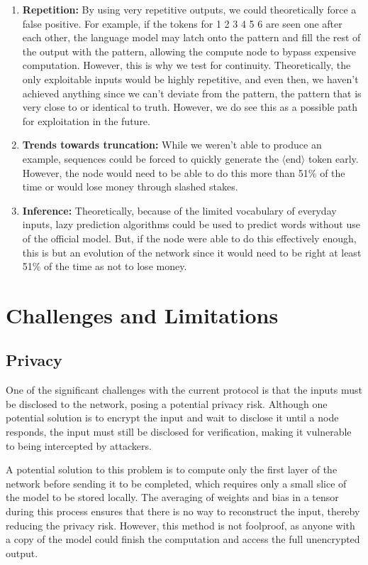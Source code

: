 \documentclass{article}
\begin{document}
\begin{enumerate}
    \item \textbf{Repetition:} By using very repetitive outputs, we could theoretically force a false positive. 
    For example, if the tokens for 1 2 3 4 5 6 are seen one after each other, the language model may latch onto the pattern and fill the rest of the output with the pattern, allowing the compute node to bypass expensive computation. 
    However, this is why we test for continuity. 
    Theoretically, the only exploitable inputs would be highly repetitive, and even then, we haven't achieved anything since we can't deviate from the pattern, the pattern that is very close to or identical to truth. 
    However, we do see this as a possible path for exploitation in the future.
    \item \textbf{Trends towards truncation:} While we weren't able to produce an example, sequences could be forced to quickly generate the $\langle$end$\rangle$ token early. 
    However, the node would need to be able to do this more than 51\% of the time or would lose money through slashed stakes.
    \item \textbf{Inference:} Theoretically, because of the limited vocabulary of everyday inputs, lazy prediction algorithms could be used to predict words without use of the official model.
     But, if the node were able to do this effectively enough, this is but an evolution of the network since it would need to be right at least 51\% of the time as not to lose money.
\end{enumerate}

\section{Challenges and Limitations}
\subsection{Privacy}
One of the significant challenges with the current protocol is that the inputs must be disclosed to the network, posing a potential privacy risk. 
Although one potential solution is to encrypt the input and wait to disclose it until a node responds, the input must still be disclosed for verification, making it vulnerable to being intercepted by attackers.

A potential solution to this problem is to compute only the first layer of the network before sending it to be completed, which requires only a small slice of the model to be stored locally. 
The averaging of weights and bias in a tensor during this process ensures that there is no way to reconstruct the input, thereby reducing the privacy risk. 
However, this method is not foolproof, as anyone with a copy of the model could finish the computation and access the full unencrypted output.
\end{document}
